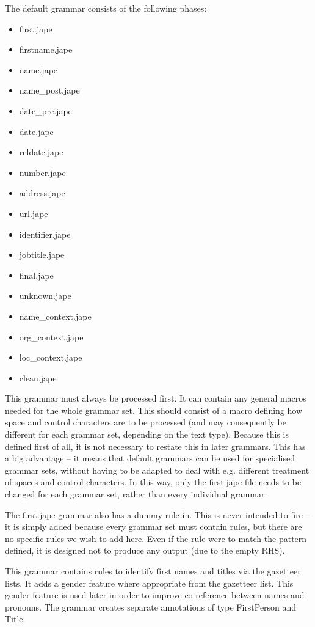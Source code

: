 The default grammar consists of the following phases:
\begin{itemize}
\item first.jape
\item firstname.jape
\item name.jape
\item name\_post.jape
\item date\_pre.jape
\item date.jape
\item reldate.jape
\item number.jape
\item address.jape
\item url.jape
\item identifier.jape
\item jobtitle.jape
\item final.jape
\item unknown.jape
\item name\_context.jape
\item org\_context.jape
\item loc\_context.jape
\item clean.jape
\end{itemize}



This grammar must always be processed first. It can contain any
general macros needed for the whole grammar set. This should consist
of a macro defining how space and control characters are to be
processed (and may consequently be different for each grammar set,
depending on the text type). Because this is defined first of all, it
is not necessary to restate this in later grammars. This has a big
advantage -- it means that default grammars can be used for specialised
grammar sets, without having to be adapted to deal with e.g. different
treatment of spaces and control characters. In this way, only the
first.jape file needs to be changed for each grammar set, rather than
every individual grammar.

The first.jape grammar also has a dummy rule in. This is never
intended to fire -- it is simply added because every grammar set must
contain rules, but there are no specific rules we wish to add
here. Even if the rule were to match the pattern defined, it is
designed not to produce any output (due to the empty RHS).

This grammar contains rules to identify first names and titles via the
gazetteer lists. It adds a gender feature where appropriate from the
gazetteer list. This gender feature is used later in order to improve
co-reference between names and pronouns. The grammar creates
separate annotations of type FirstPerson and Title.

